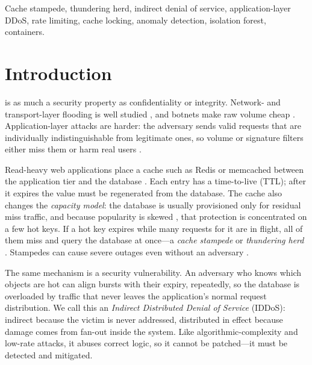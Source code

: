 \documentclass[journal]{IEEEtran}
\begin{document}
\begin{IEEEkeywords}
Cache stampede, thundering herd, indirect denial of service, application-layer DDoS,
rate limiting, cache locking, anomaly detection, isolation forest, containers.
\end{IEEEkeywords}

\section{Introduction}
\label{sec:intro}
 is as much a security property as confidentiality or
integrity. Network- and transport-layer flooding is well studied
\cite{mirkovic2004,zargar2013}, and botnets make raw volume cheap \cite{antonakakis2017}.
Application-layer attacks are harder: the adversary sends valid requests that are
individually indistinguishable from legitimate ones, so volume or signature filters
either miss them or harm real users \cite{praseed2019,xie2009,ranjan2009}.

Read-heavy web applications place a cache such as Redis or memcached between the
application tier and the database \cite{fitzpatrick2004,nishtala2013}. Each entry has a
time-to-live (TTL); after it expires the value must be regenerated from the database.
The cache also changes the \emph{capacity model}: the database is usually provisioned
only for residual miss traffic, and because popularity is skewed
\cite{breslau1999,atikoglu2012}, that protection is concentrated on a few hot keys. If
a hot key expires while many requests for it are in flight, all of them miss and query
the database at once---a \emph{cache stampede} or \emph{thundering herd}
\cite{vattani2015,nishtala2013}. Stampedes can cause severe outages even without an
adversary \cite{johnson2010,beyer2016}.

The same mechanism is a security vulnerability. An adversary who knows which objects
are hot can align bursts with their expiry, repeatedly, so the database is overloaded
by traffic that never leaves the application's normal request distribution. We call
this an \emph{Indirect Distributed Denial of Service} (IDDoS): indirect because the
victim is never addressed, distributed in effect because damage comes from fan-out
inside the system. Like algorithmic-complexity \cite{crosby2003} and low-rate
\cite{kuzmanovic2003} attacks, it abuses correct logic, so it cannot be patched---it
must be detected and mitigated.
\end{document}
